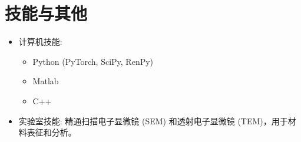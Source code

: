 \documentclass{article}
\begin{document}
\section*{技能与其他}
\begin{itemize}
    \item 计算机技能:
    \begin{itemize}
        \item Python (PyTorch, SciPy, RenPy)
        \item Matlab
        \item C++
    \end{itemize}
    \item 实验室技能: 精通扫描电子显微镜 (SEM) 和透射电子显微镜 (TEM)，用于材料表征和分析。
\end{itemize}
\end{document}
